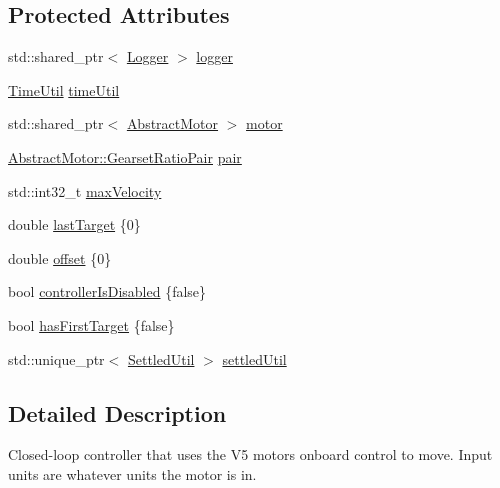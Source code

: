 \subsection*{Protected Attributes}
\begin{DoxyCompactItemize}
\item 
std\+::shared\+\_\+ptr$<$ \mbox{\hyperlink{classokapi_1_1Logger}{Logger}} $>$ \mbox{\hyperlink{classokapi_1_1AsyncPosIntegratedController_a8bf0ffc06146b3b94b99e67a5321be3f}{logger}}
\item 
\mbox{\hyperlink{classokapi_1_1TimeUtil}{Time\+Util}} \mbox{\hyperlink{classokapi_1_1AsyncPosIntegratedController_a128a3c1837b700afe7acd08af41799e8}{time\+Util}}
\item 
std\+::shared\+\_\+ptr$<$ \mbox{\hyperlink{classokapi_1_1AbstractMotor}{Abstract\+Motor}} $>$ \mbox{\hyperlink{classokapi_1_1AsyncPosIntegratedController_a6e75dccbe6c1634dbb018a1d86f23edb}{motor}}
\item 
\mbox{\hyperlink{structokapi_1_1AbstractMotor_1_1GearsetRatioPair}{Abstract\+Motor\+::\+Gearset\+Ratio\+Pair}} \mbox{\hyperlink{classokapi_1_1AsyncPosIntegratedController_a70d4b32dda21ed2f5e2c944b8ad78c36}{pair}}
\item 
std\+::int32\+\_\+t \mbox{\hyperlink{classokapi_1_1AsyncPosIntegratedController_a7a95aef2b429d73a6c8b1696f02727dd}{max\+Velocity}}
\item 
double \mbox{\hyperlink{classokapi_1_1AsyncPosIntegratedController_af158cd794225bad03ab07560dcc70bcb}{last\+Target}} \{0\}
\item 
double \mbox{\hyperlink{classokapi_1_1AsyncPosIntegratedController_a6925855ac71fc3d609844f90bd09dd62}{offset}} \{0\}
\item 
bool \mbox{\hyperlink{classokapi_1_1AsyncPosIntegratedController_afd0b5307a43a05e8b541af9819a097b3}{controller\+Is\+Disabled}} \{false\}
\item 
bool \mbox{\hyperlink{classokapi_1_1AsyncPosIntegratedController_a8ac17264d716b7a07d4f20c003653c9e}{has\+First\+Target}} \{false\}
\item 
std\+::unique\+\_\+ptr$<$ \mbox{\hyperlink{classokapi_1_1SettledUtil}{Settled\+Util}} $>$ \mbox{\hyperlink{classokapi_1_1AsyncPosIntegratedController_a3d8f6b2fc0cc4019742de861b0e42d60}{settled\+Util}}
\end{DoxyCompactItemize}


\subsection{Detailed Description}
Closed-\/loop controller that uses the V5 motor\textquotesingle{}s onboard control to move. Input units are whatever units the motor is in. 

